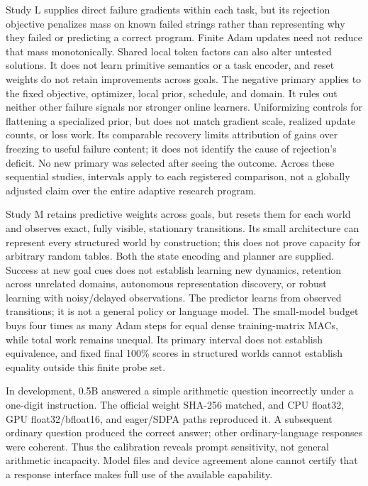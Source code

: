 \documentclass[11pt]{article}
\begin{document}
Study L supplies direct failure gradients within each task, but its rejection
objective penalizes mass on known failed strings rather than representing why
they failed or predicting a correct program. Finite Adam updates need not
reduce that mass monotonically. Shared local token factors can
also alter untested solutions. It does not learn primitive semantics or a
task encoder, and reset weights do not retain improvements across goals.
The negative primary applies to the fixed objective, optimizer, local prior,
schedule, and domain. It rules out neither other failure signals nor stronger
online learners. Uniformizing controls for flattening a specialized prior,
but does not match gradient scale, realized update counts, or loss work.
Its comparable recovery limits attribution of gains over freezing to useful
failure content; it does not identify the cause of rejection's deficit.
No new primary was selected after seeing the outcome. Across these sequential
studies, intervals apply to each registered comparison, not a globally adjusted
claim over the entire adaptive research program.

Study M retains predictive weights across goals, but resets them for each
world and observes exact, fully visible, stationary transitions. Its small
architecture can represent every structured world by construction; this does
not prove capacity for arbitrary random tables. Both the state encoding and
planner are supplied. Success at new goal cues does not establish learning
new dynamics, retention across unrelated domains, autonomous representation
discovery, or robust learning with noisy/delayed observations. The predictor
learns from observed transitions; it is not a general policy or language model.
The small-model budget buys four times as many Adam steps for equal dense
training-matrix MACs, while total work remains unequal. Its primary interval
does not establish equivalence, and fixed final 100\% scores in structured
worlds cannot establish equality outside this finite probe set.

In development, 0.5B answered a simple arithmetic question incorrectly under
a one-digit instruction. The official weight SHA-256 matched, and CPU float32,
GPU float32/bfloat16, and eager/SDPA paths reproduced it. A subsequent ordinary
question produced the correct answer; other ordinary-language responses were
coherent. Thus the calibration reveals prompt sensitivity, not general
arithmetic incapacity. Model files and device agreement alone cannot certify
that a response interface makes full use of the available capability.
\end{document}

